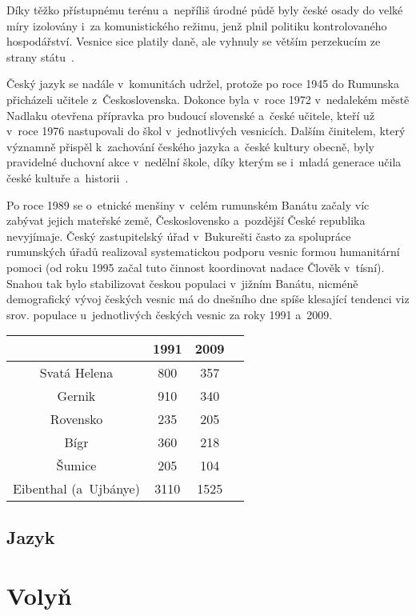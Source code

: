 Díky těžko přístupnému terénu a~nepříliš úrodné půdě byly české osady do velké míry izolovány i~za komunistického režimu, jenž plnil politiku kontrolovaného hospodářství. Vesnice sice platily daně, ale vyhnuly se větším perzekucím ze strany státu~\parencite{Frnochova2012}.

Český jazyk se nadále v~komunitách udržel, protože po roce 1945 do Rumunska přicházeli učitele z~Československa. Dokonce byla v~roce 1972 v~nedalekém městě Nadlaku otevřena přípravka pro budoucí slovenské a~české učitele, kteří už v~roce 1976 nastupovali do škol v~jednotlivých vesnicích. Dalším činitelem, který významně přispěl k~zachování českého jazyka a~české kultury obecně, byly pravidelné duchovní akce v~nedělní škole, díky kterým se i~mladá generace učila české kultuře a~historii~\parencite{Vaculik2009b}.

Po roce 1989 se o~etnické menšiny v~celém rumunském Banátu začaly víc zabývat jejich mateřské země, Československo a~pozdější České republika nevyjímaje. Český zastupitelský úřad v~Bukurešti často za spolupráce rumunských úřadů realizoval systematickou podporu vesnic formou humanitární pomoci (od roku 1995 začal tuto činnost koordinovat nadace Člověk v~tísní). Snahou tak bylo stabilizovat českou populaci v~jižním Banátu, nicméně demografický vývoj českých vesnic má do dnešního dne spíše klesající tendenci viz srov. populace u~jednotlivých českých vesnic za roky 1991 a~2009.

\begin{center}
\begin{tabular}{||c c c c||}
\hline
& 1991 & 2009 \\ [0.5ex]
\hline\hline
Svatá Helena & 800 & 357 \\
\hline
Gernik & 910 & 340 \\
\hline
Rovensko & 235 & 205 \\
\hline
Bígr & 360 & 218 \\
\hline
Šumice & 205 & 104 \\ [1ex]
\hline
Eibenthal (a~Ujbánye) & 3110 & 1525 \\ [1ex]
\hline
\end{tabular}
\end{center}

\hypertarget{jazyk}{%
\subsection*{Jazyk}\label{jazyk}}

\hypertarget{volyux148}{%
\section{Volyň}\label{volyux148}}

